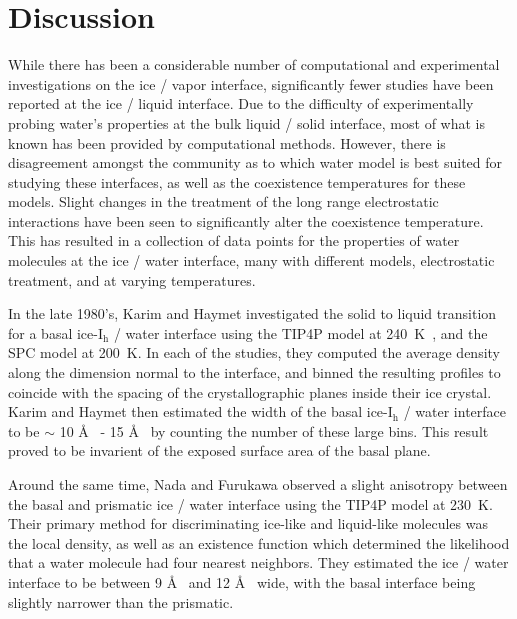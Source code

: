 \section{Discussion}
While there has been a considerable number of computational and
experimental investigations on the ice / vapor
interface\cite{Bolton2000,Conde2008,Gladich2011,Sazaki2011,Pfalzgraff2011,Watkins2011,Bartels-Rausch2014,Gladich2015,Murata2015,Asakawa2016,Benet2016,Murata2016,Neshyba2016,Limmer2016,Michaelides2017,Sancheza2017},
significantly fewer studies have been reported at the ice / liquid
interface. \cite{Beaglehole1980,Karim1988,Karim1990,Hayward2001,Hayward2002,Bryk2002,Gay2002}
Due to the difficulty of experimentally probing water's properties at
the bulk liquid / solid interface, most of what is known has been
provided by computational methods. However, there is disagreement
amongst the community as to which water model is best suited for
studying these
interfaces\cite{Sanz2004a,Vega2005c,Abascal2007,Vega2009}, as well as
the coexistence temperatures for these
models.\cite{Gao2000,Bryk2004,Sanz2004a,Vega2006a,Abascal2007,Paesani2016}
Slight changes in the treatment of the long range electrostatic
interactions have been seen to significantly alter the coexistence
temperature.\cite{Bryk2004} This has resulted in a collection of data
points for the properties of water molecules at the ice / water
interface, many with different models, electrostatic treatment, and at
varying temperatures.

In the late 1980's, Karim and Haymet investigated the solid to liquid
transition for a basal ice-I$_\mathrm{h}$ / water interface using the
TIP4P model at 240~K~\cite{Karim1987,Karim1988}, and the SPC model at
200~K.\cite{Karim1990} In each of the studies, they computed the
average density along the dimension normal to the interface, and
binned the resulting profiles to coincide with the
spacing of the crystallographic planes inside their ice crystal. Karim
and Haymet then estimated the width of the basal ice-I$_\mathrm{h}$ /
water interface to be $\sim$ 10 \AA~ - 15 \AA~ by counting the number of
these large bins. This result proved to be invarient of the exposed
surface area of the basal plane.

Around the same time, Nada and Furukawa observed a slight anisotropy
between the basal and prismatic ice / water interface using the TIP4P
model at 230~K.\cite{Nada1995} Their primary method for discriminating
ice-like and liquid-like molecules was the local density, as well as
an existence function which determined the likelihood that a water
molecule had four nearest neighbors. They estimated the ice / water
interface to be between 9 \AA~ and 12 \AA~ wide, with the basal
interface being slightly narrower than the prismatic.

